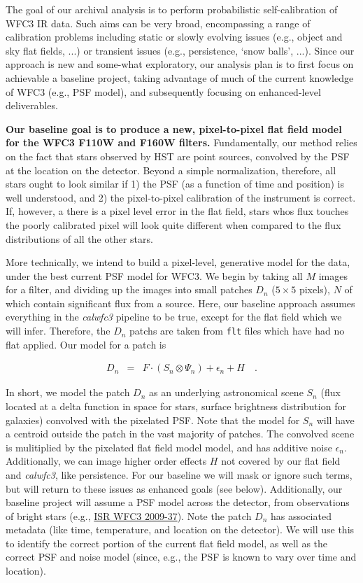 \documentclass[12pt]{article}
\begin{document}
The goal of our archival analysis is to perform probabilistic
self-calibration of WFC3 IR data.  Such aims can be very broad,
encompassing a range of calibration problems including static or slowly 
evolving issues (e.g., object and sky flat fields, ...) or transient
issues (e.g., persistence, `snow balls', ...).  Since our approach is
new and some-what exploratory, our analysis plan is to first focus on
achievable a baseline project, taking advantage of much of the current
knowledge of WFC3 (e.g., PSF model), and subsequently focusing on
enhanced-level deliverables.

\textbf{Our baseline goal is to produce a new, pixel-to-pixel
  flat field model for the WFC3 F110W and F160W filters.}
Fundamentally, our method relies on the fact
that stars observed by HST are point sources, convolved by the PSF at
the location on the detector.  Beyond a simple normalization,
therefore, all stars ought to look similar if 1) the PSF (as a
function of time and position) is well understood, and 2) the
pixel-to-pixel calibration of the instrument is correct.  If, however,
a there is a pixel level error in the flat field, stars whos flux
touches the poorly calibrated pixel will look quite different when
compared to the flux distributions of all the other stars.  

More technically, we intend to build a pixel-level, generative model
for the data, under the best current PSF model for WFC3.  We begin by
taking all $M$ images for a filter, and dividing up the images into
small patches $D_n$ ($5 \times 5$ pixels), $N$ of which contain significant
flux from a source.  Here, our baseline approach assumes everything in
the \textsl{calwfc3} pipeline to be true, except for the flat field
which we will infer.  Therefore, the $D_n$ patchs are taken from
\texttt{flt} files which have had no flat applied.  Our model for a
patch is 

\begin{eqnarray}
D_n & = & F \cdot (S_n \otimes \Psi_n) + \epsilon_n + H
\quad .
\end{eqnarray}

In short, we model the patch $D_n$ as an underlying astronomical scene
$S_n$ (flux located at a delta function in space for stars, surface
brightness distribution for galaxies) convolved with the pixelated
PSF.  Note that the model for $S_n$ will have a centroid outside the
patch in the vast majority of patches.  The convolved scene is
mulitiplied by the pixelated flat field
model model, and has additive noise $\epsilon_n$.  Additionally, we
can image higher order effects $H$ not covered by our flat field and
\textsl{calwfc3}, like persistence.  For our baseline we will mask or
ignore such terms, but will return to these issues as enhanced goals
(see below).  Additionally, our baseline project will assume a PSF
model across the detector, from observations of bright stars (e.g.,
\href{http://bit.ly/XFSb1M}{ISR WFC3 2009-37}).  Note the patch $D_n$
has associated metadata (like time, temperature, and location on the
detector).  We will use this to identify the correct portion of the
current flat field model, as well as the correct PSF and noise model
(since, e.g., the PSF is known to vary over time and location).  
\end{document}
